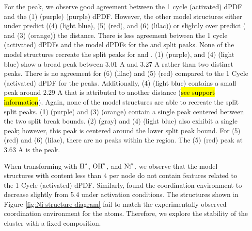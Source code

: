 \documentclass[journal=jctcce,manuscript=article]{achemso}
\begin{document}
For the  peak, we observe good agreement between the 1 cycle (activated) dPDF and the (1)  (purple) (purple) dPDF. However, the other model structures either under predict ((4)  (light blue), (5)  (red), and (6)  (lilac)) or slightly over predict ( and (3)  (orange)) the  distance. There is less agreement between the 1 cycle (activated) dPDFs and the model dPDFs for the  and  split peaks. None of the model structures recreate the split peaks for  and . (1)  (purple),  and (4)  (light blue) show a broad  peak between 3.01 A and 3.27 A rather than two distinct  peaks. There is no agreement for (6)  (lilac) and (5)  (red) compared to the 1 Cycle (activated) dPDF for the  peaks. Additionally, (4)  (light blue) contains a small peak around 2.29 A that is attributed to another  distance (\hl{see support information}). Again, none of the model structures are able to recreate the split  split peaks. (1)  (purple) and 
(3)  (orange) contain a single peak centered between the two  split break bounds. (2)  (gray) and (4)  (light blue) also exhibit a single peak; however, this peak is centered around the lower  split peak bound. For (5)  (red) and (6)  (lilac), there are no peaks within the  region. The (5)  (red) peak at 3.63 A is the  peak. 

When transforming with $\ce{H^{*}}$, $\ce{OH^{*}}$, and $\ce{Ni^{*}}$, we observe that the model structures with  content less than 4  per node do not contain features related to the 1 Cycle (activated) dPDF. Similarly, \citeauthor{PlateroPrats2017} found the  coordination environment to decrease slightly from 5.4 under activation conditions.\cite{PlateroPrats2017} The structures shown in Figure \ref{fig:Ni-structure-diagram} fail to match the experimentally observed coordination environment for the  atoms. Therefore, we explore the stability of the cluster with a fixed  composition.

\end{document}
